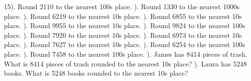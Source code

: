 \documentclass{article}%
\begin{document}
15). Round 2110 to the nearest 100s place.%
\newline%
\newline%
). Round 1330 to the nearest 1000s place.%
\newline%
\newline%
). Round 6219 to the nearest 10s place.%
\newline%
\newline%
). Round 6855 to the nearest 10s place.%
\newline%
\newline%
). Round 9955 to the nearest 10s place.%
\newline%
\newline%
). Round 9824 to the nearest 100s place.%
\newline%
\newline%
). Round 7920 to the nearest 10s place.%
\newline%
\newline%
). Round 6973 to the nearest 10s place.%
\newline%
\newline%
). Round 7627 to the nearest 10s place.%
\newline%
\newline%
). Round 6254 to the nearest 100s place.%
\newline%
\newline%
). Round 7458 to the nearest 100s place.%
\newline%
\newline%
). James has 8414 pieces of trash. What is 8414 pieces of trash rounded to the nearest 10s place?%
\newline%
\newline%
). Laura has 5248 books. What is 5248 books rounded to the nearest 10s place?%
\newline%
\newline%
\newline%
\end{document}
